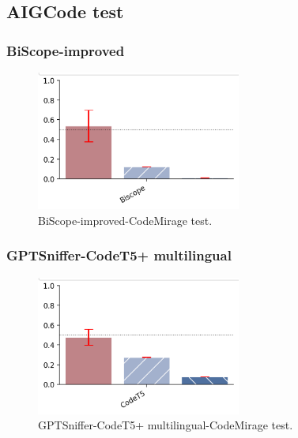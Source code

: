 \subsection{AIGCode test}

\subsubsection{BiScope-improved}
\begin{figure}[H]
    \centering
    \includegraphics[width=0.6\textwidth]{img/BiScope/AIG.png}
    \caption{BiScope-improved-CodeMirage test.}
    \label{fig:BiScope-improved-AIGCode test}
\end{figure}

\subsubsection{GPTSniffer-CodeT5+ multilingual}
\begin{figure}[H]
    \centering
    \includegraphics[width=0.6\textwidth]{img/CodeT5/AIG.png}
    \caption{GPTSniffer-CodeT5+ multilingual-CodeMirage test.}
    \label{fig:GPTSniffer-CodeT5+ multilingual-AIGCode test}
\end{figure}


